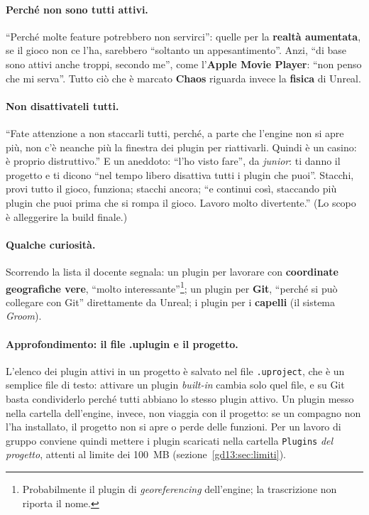 \paragraph{Perché non sono tutti attivi.} ``Perché molte feature potrebbero non
servirci'': quelle per la \textbf{realtà aumentata}, se il gioco non ce l'ha,
sarebbero ``soltanto un appesantimento''. Anzi, ``di base sono attivi anche
troppi, secondo me'', come l'\textbf{Apple Movie Player}: ``non penso che mi
serva''. Tutto ciò che è marcato \textbf{Chaos} riguarda invece la
\textbf{fisica} di Unreal.

\paragraph{Non disattivateli tutti.} ``Fate attenzione a non staccarli tutti,
perché, a parte che l'engine non si apre più, non c'è neanche più la finestra
dei plugin per riattivarli. Quindi è un casino: è proprio distruttivo.'' E un
aneddoto: ``l'ho visto fare'', da \emph{junior}: ti danno il progetto e ti dicono
``nel tempo libero disattiva tutti i plugin che puoi''. Stacchi, provi tutto il
gioco, funziona; stacchi ancora; ``e continui così, staccando più plugin che puoi
prima che si rompa il gioco. Lavoro molto divertente.'' (Lo scopo è alleggerire
la build finale.)

\paragraph{Qualche curiosità.} Scorrendo la lista il docente segnala: un plugin
per lavorare con \textbf{coordinate geografiche vere}, ``molto
interessante''\footnote{Probabilmente il plugin di \emph{georeferencing}
dell'engine; la trascrizione non riporta il nome.}; un plugin per
\textbf{Git}, ``perché si può collegare con Git'' direttamente da Unreal; i
plugin per i \textbf{capelli} (il sistema \emph{Groom}).

\paragraph{Approfondimento: il file .uplugin e il progetto.} L'elenco dei plugin
attivi in un progetto è salvato nel file \texttt{.uproject}, che è un semplice
file di testo: attivare un plugin \emph{built-in} cambia solo quel file, e su Git
basta condividerlo perché tutti abbiano lo stesso plugin attivo. Un plugin messo
nella cartella dell'engine, invece, non viaggia con il progetto: se un compagno
non l'ha installato, il progetto non si apre o perde delle funzioni. Per un
lavoro di gruppo conviene quindi mettere i plugin scaricati nella cartella
\texttt{Plugins} \emph{del progetto}, attenti al limite dei 100~MB
(sezione~\ref{gd13:sec:limiti}).

